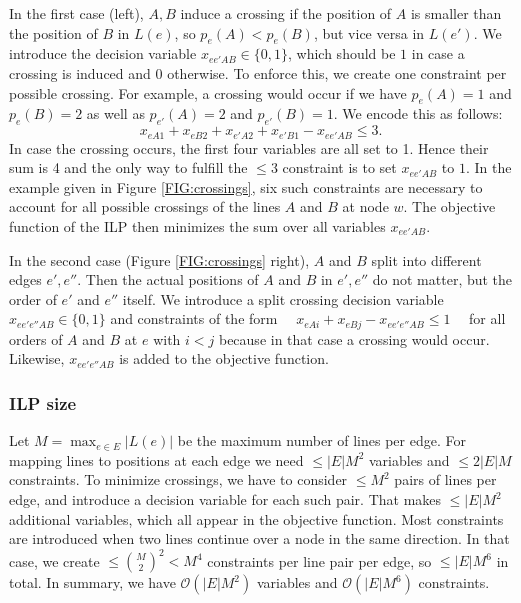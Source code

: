 \documentclass{llncs}
\begin{document}
In the first case (left), $A, B$ induce a crossing if the position of $A$ is smaller than the position of $B$ in $L(e)$, so $p_e(A) < p_e(B)$, but vice versa in $L(e')$. We introduce the decision variable $x_{ee'AB} \in \{0,1\}$, which should be $1$ in case a crossing is induced and $0$ otherwise. To enforce this, we create one constraint per possible crossing. For example, a crossing would occur if we have $p_e(A)=1$ and $p_e(B)=2$ as well as $p_{e'}(A)=2$ and $p_{e'}(B) =1$. We encode this as follows:
\begin{equation*}
	x_{eA1} + x_{eB2} + x_{e'A2} + x_{e'B1} - x_{ee'AB} \leq 3.
\end{equation*}
In case the crossing occurs, the first four variables are all set to 1. Hence their sum is 4 and the only way to fulfill the $\leq 3$ constraint is to set $x_{ee'AB}$ to $1$. In the example given in Figure \ref{FIG:crossings}, six such constraints are necessary to account for all possible crossings of the lines $A$ and $B$ at node $w$.
The objective function of the ILP then minimizes the sum over all variables $x_{ee'AB}$.

In the second case (Figure \ref{FIG:crossings} right), $A$ and $B$ split into different edges $e', e''$. Then the actual positions of $A$ and $B$ in $e', e''$ do not matter, but the order of $e'$ and $e''$ itself. We introduce a split crossing decision variable $x_{ee'e''AB} \in \{0,1\}$ and constraints of the form
$\quad x_{eAi} + x_{eBj} - x_{ee'e''AB} \leq 1 \quad$
for all orders of $A$ and $B$ at $e$ with $i < j$ because in that case a crossing would occur. Likewise, $x_{ee'e''AB}$ is added to the objective function.

\subsubsection{ILP size}
Let $M = \max_{e \in E} |L(e)|$ be the maximum number of lines per edge. For mapping lines to positions at each edge we need $\leq |E|M^{2}$ variables and $\leq 2|E|M$ constraints. To minimize crossings, we have to consider $\leq M^{2}$ pairs of lines per edge, and introduce a decision variable for each such pair. That makes $\leq |E| M^{2}$ additional variables, which all appear in the objective function. Most constraints are introduced when two lines continue over a node in the same direction. In that case, we create $\leq \binom{M}{2}^{2} < M^{4}$ constraints per line pair per edge, so $\leq |E| M^{6}$ in total.
In summary, we have $\mathcal{O}(|E|M^{2})$ variables and $\mathcal{O}(|E|M^{6})$ constraints.
\end{document}
